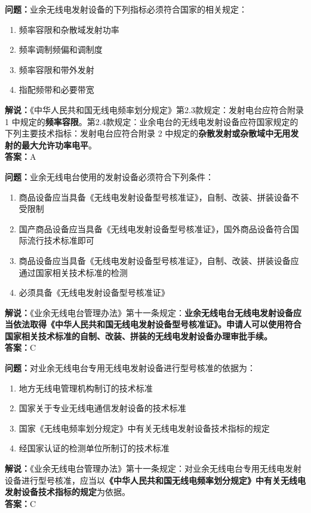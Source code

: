 \bigskip


\noindent\textbf{问题：}业余无线电发射设备的下列指标必须符合国家的相关规定：
\begin{enumerate}[label=\Alph*), leftmargin=3em]
	\item 频率容限和杂散域发射功率
	\item 频率调制频偏和调制度
	\item 频率容限和带外发射
	\item 指配频带和必要带宽
\end{enumerate}
\noindent\textbf{解说：}《中华人民共和国无线电频率划分规定》第2.3款规定：发射电台应符合附录 1 中规定的\textbf{频率容限}。第2.4款规定：业余电台的无线电发射设备应符国家规定的下列主要技术指标：发射电台应符合附录 2 中规定的\textbf{杂散发射或杂散域中无用发射的最大允许功率电平}。\\\noindent\textbf{答案：}A



\bigskip


\noindent\textbf{问题：}业余无线电台使用的发射设备必须符合下列条件：
\begin{enumerate}[label=\Alph*), leftmargin=3em]
	\item 商品设备应当具备《无线电发射设备型号核准证》，自制、改装、拼装设备不受限制
	\item 国产商品设备应当具备《无线电发射设备型号核准证》，国外商品设备符合国际流行技术标准即可
	\item 商品设备应当具备《无线电发射设备型号核准证》，自制、改装、拼装设备应通过国家相关技术标准的检测
	\item 必须具备《无线电发射设备型号核准证》
\end{enumerate}
\noindent\textbf{解说：}《业余无线电台管理办法》第十一条规定：\textbf{业余无线电台无线电发射设备应当依法取得《中华人民共和国无线电发射设备型号核准证》。申请人可以使用符合国家相关技术标准的自制、改装、拼装的无线电发射设备办理审批手续。}\\\noindent\textbf{答案：}C



\bigskip


\noindent\textbf{问题：}对业余无线电台专用无线电发射设备进行型号核准的依据为：
\begin{enumerate}[label=\Alph*), leftmargin=3em]
	\item 地方无线电管理机构制订的技术标准
	\item 国家关于专业无线电通信发射设备的技术标准
	\item 国家《无线电频率划分规定》中有关无线电发射设备技术指标的规定
	\item 经国家认证的检测单位所制订的技术标准
\end{enumerate}
\noindent\textbf{解说：}《业余无线电台管理办法》第十一条规定：对业余无线电台专用无线电发射设备进行型号核准，应当以\textbf{《中华人民共和国无线电频率划分规定》中有关无线电发射设备技术指标的规定}为依据。\\\noindent\textbf{答案：}C



